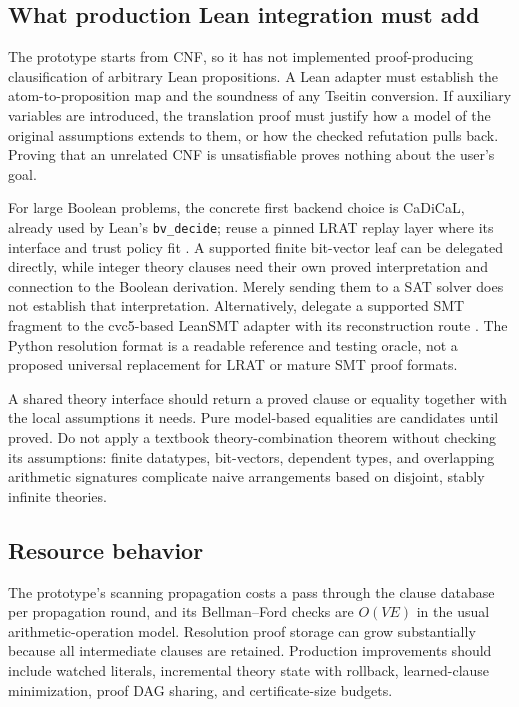 \documentclass[11pt,letterpaper]{article}
\newcommand{\code}[1]{\texttt{#1}}
\theoremstyle{definition}\newtheorem{definition}[theorem]{Definition}
\theoremstyle{remark}\newtheorem{remark}[theorem]{Remark}
\begin{document}
\subsection{What production Lean integration must add}
The prototype starts from CNF, so it has not implemented proof-producing clausification of arbitrary Lean propositions. A Lean adapter must establish the atom-to-proposition map and the soundness of any Tseitin conversion. If auxiliary variables are introduced, the translation proof must justify how a model of the original assumptions extends to them, or how the checked refutation pulls back. Proving that an unrelated CNF is unsatisfiable proves nothing about the user's goal.

For large Boolean problems, the concrete first backend choice is CaDiCaL, already used by Lean's \code{bv\_decide}; reuse a pinned LRAT replay layer where its interface and trust policy fit \cite{bv}. A supported finite bit-vector leaf can be delegated directly, while integer theory clauses need their own proved interpretation and connection to the Boolean derivation. Merely sending them to a SAT solver does not establish that interpretation. Alternatively, delegate a supported SMT fragment to the cvc5-based LeanSMT adapter with its reconstruction route \cite{leansmt}. The Python resolution format is a readable reference and testing oracle, not a proposed universal replacement for LRAT or mature SMT proof formats.

A shared theory interface should return a proved clause or equality together with the local assumptions it needs. Pure model-based equalities are candidates until proved. Do not apply a textbook theory-combination theorem without checking its assumptions: finite datatypes, bit-vectors, dependent types, and overlapping arithmetic signatures complicate naive arrangements based on disjoint, stably infinite theories.

\subsection{Resource behavior}
The prototype's scanning propagation costs a pass through the clause database per propagation round, and its Bellman--Ford checks are $O(VE)$ in the usual arithmetic-operation model. Resolution proof storage can grow substantially because all intermediate clauses are retained. Production improvements should include watched literals, incremental theory state with rollback, learned-clause minimization, proof DAG sharing, and certificate-size budgets.
\end{document}
